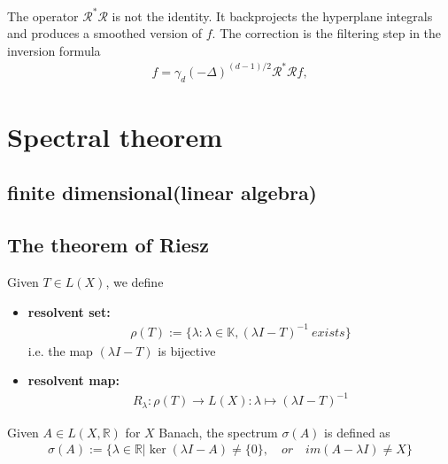 \begin{remark}
The operator $\mathcal{R}^*\mathcal{R}$ is not the identity. It backprojects the hyperplane integrals and produces a smoothed version of $f$. The correction is the filtering step in the inversion formula
\begin{align*}
	f = \gamma_d (-\Delta)^{(d-1)/2}\mathcal{R}^*\mathcal{R}f,
\end{align*}
\end{remark}






\newpage
\section{Spectral theorem}
\subsection{finite dimensional(linear algebra)}
\begin{review}
\end{review}

\begin{definition}
\end{definition}


\subsection{The theorem of Riesz}
\begin{definition}[resolvent]
Given $T \in L(X)$, we define
\begin{itemize}
	\item \textbf{resolvent set:}
	\begin{align*}
		\rho(T):= \{\lambda: \lambda\in \mathbb{K}, (\lambda I - T)^{-1}\ exists\}
	\end{align*}
	i.e. the map $(\lambda I - T)$ is bijective
	\item \textbf{resolvent map:}
	\begin{align*}
		R_\lambda: \rho(T) \rightarrow L(X): \lambda \mapsto (\lambda I - T)^{-1}
	\end{align*}
\end{itemize}
	
\end{definition}
\begin{definition}
	Given $A \in L(X, \mathbb{R})$ for $X$ Banach, the spectrum $\sigma(A)$ is defined as
	\begin{align*}
		\sigma(A):=  \bigg\{ \lambda \in \mathbb{R}\bigg| \ker(\lambda I - A) \neq \{0\}, \quad or \quad im(A - \lambda I) \neq X\bigg\}
	\end{align*} 
\end{definition}

